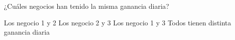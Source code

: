 ¿Cuáles negocios han tenido la misma ganancia diaria?


\begin{choices}
    \CorrectChoice Los negocio 1 y 2
    \choice Los negocio 2 y 3
    \choice Los negocio 1 y 3
    \choice Todos tienen distinta ganancia diaria
\end{choices}